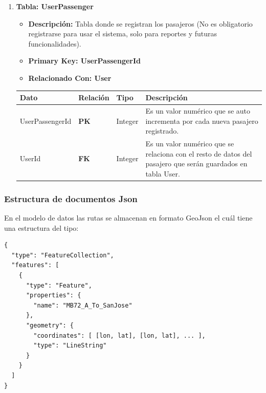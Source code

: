 \documentclass[12pt]{article}
\begin{document}
\begin{enumerate}
    \newpage
    \item \textbf{Tabla: UserPassenger}
    \begin{itemize}
        \item \textbf{Descripción:} Tabla donde se registran los pasajeros (No es obligatorio registrarse para usar el sistema, solo para reportes y futuras funcionalidades).
        \item \textbf{Primary Key: UserPassengerId}
        \item \textbf{Relacionado Con: User}
    \end{itemize}
    \begin{table}[!h]
        \centering
        \begin{tabular}{|p{3cm}|p{2cm}|p{2.5cm}|p{8cm}|}
             \hline
             \textbf{Dato} & \textbf{Relación} & \textbf{Tipo} & \textbf{Descripción} \\
             \hline
             UserPassengerId & \textbf{PK} & Integer & Es un valor numérico que se auto incrementa por cada nueva pasajero registrado.\\
             \hline
             UserId & \textbf{FK} & Integer & Es un valor numérico que se relaciona con el resto de datos del pasajero que serán guardados en tabla User. \\
             \hline
        \end{tabular}
    \end{table}
\end{enumerate}

\subsubsection{Estructura de documentos Json}
En el modelo de datos las rutas se almacenan en formato GeoJson el cuál tiene una estructura del tipo:
\begin{lstlisting}[style=json, label=lst:geojson]
{
  "type": "FeatureCollection",
  "features": [
    {
      "type": "Feature",
      "properties": {
        "name": "MB72_A_To_SanJose"
      },
      "geometry": {
        "coordinates": [ [lon, lat], [lon, lat], ... ],
        "type": "LineString"
      }
    }
  ]
}
\end{lstlisting}
\newpage
\end{document}

